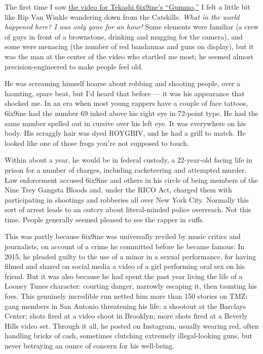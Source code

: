 The first time I saw
\href{https://www.youtube.com/watch?v=gAs9HZC9c7Y}{the video for Tekashi
6ix9ine's ``Gummo,''} I felt a little bit like Rip Van Winkle wandering
down from the Catskills. \emph{What in the world happened here? I was
only gone for an hour!} Some elements were familiar (a crew of guys in
front of a brownstone, drinking and mugging for the camera), and some
were menacing (the number of red bandannas and guns on display), but it
was the man at the center of the video who startled me most; he seemed
almost precision-engineered to make people feel old.

He was screaming himself hoarse about robbing and shooting people, over
a haunting, spare beat, but I'd heard that before --- it was his
appearance that shocked me. In an era when most young rappers have a
couple of face tattoos, 6ix9ine had the number 69 inked above his right
eye in 72-point type. He had the same number spelled out in cursive over
his left eye. It was everywhere on his body. His scraggly hair was dyed
ROYGBIV, and he had a grill to match. He looked like one of those frogs
you're not supposed to touch.

Within about a year, he would be in federal custody, a 22-year-old
facing life in prison for a number of charges, including racketeering
and attempted murder. Law enforcement accused 6ix9ine and others in his
circle of being members of the Nine Trey Gangsta Bloods and, under the
RICO Act, charged them with participating in shootings and robberies all
over New York City. Normally this sort of arrest leads to an outcry
about literal-minded police overreach. Not this time. People generally
seemed pleased to see the rapper in cuffs.

This was partly because 6ix9ine was universally reviled by music critics
and journalists, on account of a crime he committed before he became
famous: In 2015, he pleaded guilty to the use of a minor in a sexual
performance, for having filmed and shared on social media a video of a
girl performing oral sex on his friend. But it was also because he had
spent the past year living the life of a Looney Tunes character:
courting danger, narrowly escaping it, then taunting his foes. This
genuinely incredible run netted him more than 150 stories on TMZ: gang
members in San Antonio threatening his life; a shootout at the Barclays
Center; shots fired at a video shoot in Brooklyn; more shots fired at a
Beverly Hills video set. Through it all, he posted on Instagram, usually
wearing red, often handling bricks of cash, sometimes clutching
extremely illegal-looking guns, but never betraying an ounce of concern
for his well-being.

